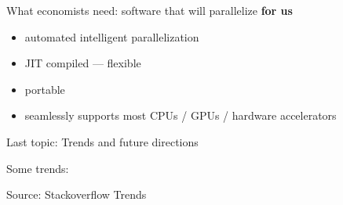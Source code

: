 \documentclass[
    xcolor={svgnames,dvipsnames},
    hyperref={colorlinks, citecolor=DeepPink4, linkcolor=DarkRed, urlcolor=DarkBlue}
    ]{beamer}  %
\newcommand{\1}{\mathbbm 1}
\begin{document}
\begin{frame}
    
    What economists need: software that will parallelize \textbf{for us}

    \begin{itemize}
        \item automated intelligent parallelization
    \vspace{0.5em}
        \item JIT compiled  --- flexible
    \vspace{0.5em}
        \item portable
    \vspace{0.5em}
        \item seamlessly supports most CPUs / GPUs / hardware accelerators
    \end{itemize}



\end{frame}


\begin{frame}
    

    Last topic: Trends and future directions

\end{frame}


\begin{frame}

    Some trends: 

    \begin{figure}
       \begin{center}
       \end{center}
    \end{figure}

    Source: Stackoverflow Trends

\end{frame}
\end{document}
